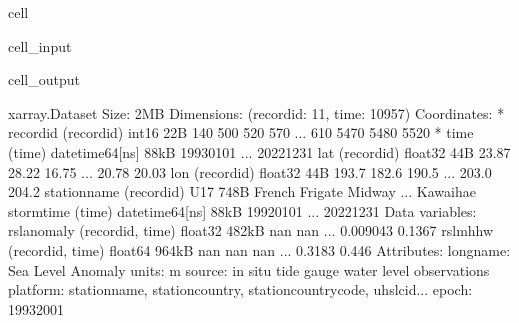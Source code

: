 \documentclass[letterpaper,10pt,english]{jupyterBook}
\begin{document}
\begin{sphinxuseclass}{cell}
\begin{sphinxVerbatimInput}
\begin{sphinxuseclass}{cell_input}
\begin{sphinxVerbatim}[commandchars=\\\{\}]
\end{sphinxVerbatim}

\end{sphinxuseclass}\end{sphinxVerbatimInput}
\begin{sphinxVerbatimOutput}

\begin{sphinxuseclass}{cell_output}
\begin{sphinxVerbatim}[commandchars=\\\{\}]
\PYGZlt{}xarray.Dataset\PYGZgt{} Size: 2MB
Dimensions:       (record\PYGZus{}id: 11, time: 10957)
Coordinates:
  * record\PYGZus{}id     (record\PYGZus{}id) int16 22B 140 500 520 570 ... 610 5470 5480 5520
  * time          (time) datetime64[ns] 88kB 1993\PYGZhy{}01\PYGZhy{}01 ... 2022\PYGZhy{}12\PYGZhy{}31
    lat           (record\PYGZus{}id) float32 44B 23.87 28.22 16.75 ... 20.78 20.03
    lon           (record\PYGZus{}id) float32 44B 193.7 182.6 190.5 ... 203.0 204.2
    station\PYGZus{}name  (record\PYGZus{}id) \PYGZlt{}U17 748B \PYGZsq{}French Frigate\PYGZsq{} \PYGZsq{}Midway\PYGZsq{} ... \PYGZsq{}Kawaihae\PYGZsq{}
    storm\PYGZus{}time    (time) datetime64[ns] 88kB 1992\PYGZhy{}01\PYGZhy{}01 ... 2022\PYGZhy{}12\PYGZhy{}31
Data variables:
    rsl\PYGZus{}anomaly   (record\PYGZus{}id, time) float32 482kB nan nan ... \PYGZhy{}0.009043 \PYGZhy{}0.1367
    rsl\PYGZus{}mhhw      (record\PYGZus{}id, time) float64 964kB nan nan nan ... \PYGZhy{}0.3183 \PYGZhy{}0.446
Attributes:
    long\PYGZus{}name:  Sea Level Anomaly
    units:      m
    source:     in situ tide gauge water level observations
    platform:   station\PYGZus{}name, station\PYGZus{}country, station\PYGZus{}country\PYGZus{}code, uhslc\PYGZus{}id...
    epoch:      1993\PYGZhy{}2001
\end{sphinxVerbatim}

\end{sphinxuseclass}\end{sphinxVerbatimOutput}

\end{sphinxuseclass}
\end{document}

